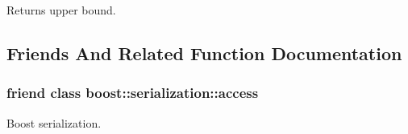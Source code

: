 Returns upper bound. 



\subsection{Friends And Related Function Documentation}
\hypertarget{class_c_optimization_variable_ac98d07dd8f7b70e16ccb9a01abf56b9c}{
\subsubsection[{boost\-::serialization\-::access}]{\setlength{\rightskip}{0pt plus 5cm}friend class boost\-::serialization\-::access\hspace{0.3cm}{\ttfamily [friend]}}}\label{class_c_optimization_variable_ac98d07dd8f7b70e16ccb9a01abf56b9c}


Boost serialization. 



